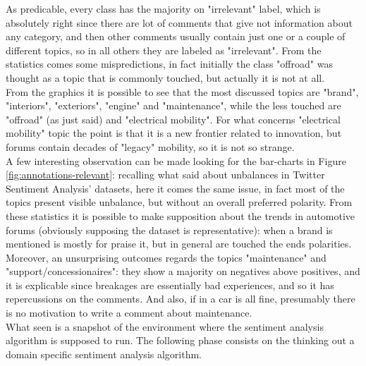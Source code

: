 As predicable, every class has the majority on "irrelevant" label, which is absolutely right since there are lot of comments that give not information about any category, and then other comments usually contain just one or a couple of different topics, so in all others they are labeled as "irrelevant". From the statistics comes some mispredictions, in fact initially the class "offroad" was thought as a topic that is commonly touched, but actually it is not at all. \\
From the graphics it is possible to see that the most discussed topics are "brand", "interiors", "exteriors", "engine" and "maintenance", while the less touched are "offroad" (as just said) and "electrical mobility". For what concerns "electrical mobility" topic the point is that it is a new frontier related to innovation, but forums contain decades of "legacy" mobility, so it is not so strange.\\
A few interesting observation can be made looking for the bar-charts in Figure \ref{fig:annotations-relevant}: recalling what said about unbalances in Twitter Sentiment Analysis' datasets, here it comes the same issue, in fact most of the topics present visible unbalance, but without an overall preferred polarity. From these statistics it is possible to make supposition about the trends in automotive forums (obviously supposing the dataset is representative): when a brand is mentioned is mostly for praise it, but in general are touched the ends polarities. Moreover, an unsurprising outcomes regards the topics "maintenance" and "support/concessionaires": they show a majority on negatives above positives, and it is explicable since breakages are essentially bad experiences, and so it has repercussions on the comments. And also, if in a car is all fine, presumably there is no motivation to write a comment about maintenance.\\

What seen is a snapshot of the environment where the sentiment analysis algorithm is supposed to run. The following phase consists on the thinking out a domain specific sentiment analysis algorithm.





